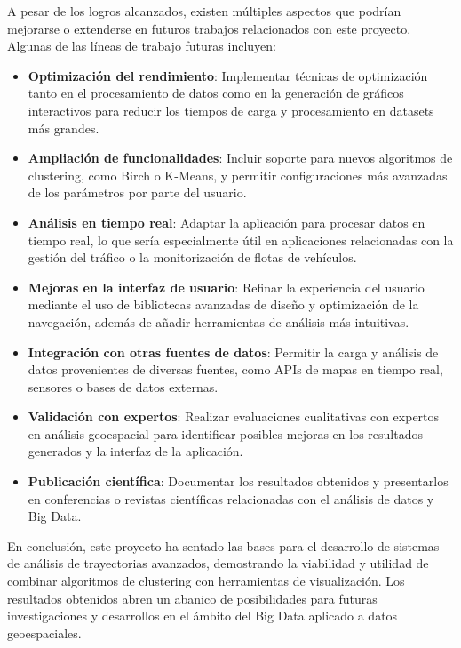 A pesar de los logros alcanzados, existen múltiples aspectos que podrían mejorarse o extenderse en futuros trabajos relacionados con este proyecto. Algunas de las líneas de trabajo futuras incluyen:

\begin{itemize}
    \item \textbf{Optimización del rendimiento}: Implementar técnicas de optimización tanto en el procesamiento de datos como en la generación de gráficos interactivos para reducir los tiempos de carga y procesamiento en datasets más grandes.
    \item \textbf{Ampliación de funcionalidades}: Incluir soporte para nuevos algoritmos de clustering, como Birch o K-Means, y permitir configuraciones más avanzadas de los parámetros por parte del usuario.
    \item \textbf{Análisis en tiempo real}: Adaptar la aplicación para procesar datos en tiempo real, lo que sería especialmente útil en aplicaciones relacionadas con la gestión del tráfico o la monitorización de flotas de vehículos.
    \item \textbf{Mejoras en la interfaz de usuario}: Refinar la experiencia del usuario mediante el uso de bibliotecas avanzadas de diseño y optimización de la navegación, además de añadir herramientas de análisis más intuitivas.
    \item \textbf{Integración con otras fuentes de datos}: Permitir la carga y análisis de datos provenientes de diversas fuentes, como APIs de mapas en tiempo real, sensores o bases de datos externas.
    \item \textbf{Validación con expertos}: Realizar evaluaciones cualitativas con expertos en análisis geoespacial para identificar posibles mejoras en los resultados generados y la interfaz de la aplicación.
    \item \textbf{Publicación científica}: Documentar los resultados obtenidos y presentarlos en conferencias o revistas científicas relacionadas con el análisis de datos y Big Data.
\end{itemize}

En conclusión, este proyecto ha sentado las bases para el desarrollo de sistemas de análisis de trayectorias avanzados, demostrando la viabilidad y utilidad de combinar algoritmos de clustering con herramientas de visualización. Los resultados obtenidos abren un abanico de posibilidades para futuras investigaciones y desarrollos en el ámbito del Big Data aplicado a datos geoespaciales.
